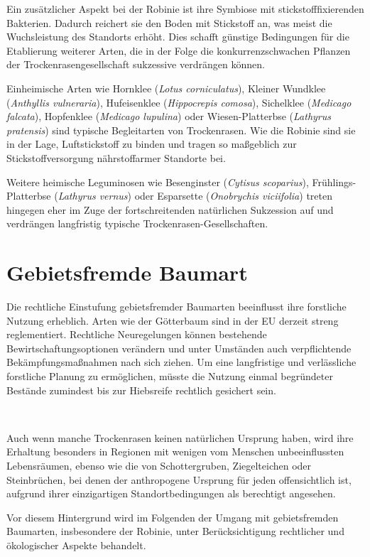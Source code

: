 \documentclass[twocolumn]{scrartcl}
\makeatletter
\newcommand{\summary}[1]{%
  \par %
  {\small\sffamily
    \noindent #1\par}
  \vspace{-0.4em}
  \noindent\makebox[\linewidth]{\rule{0.33\linewidth}{0.4pt}}\\[-1.2em]
  \@afterindentfalse\@afterheading
}
\makeatother
\begin{document}
Ein zusätzlicher Aspekt bei der Robinie ist ihre Symbiose mit
stickstofffixierenden Bakterien. Dadurch reichert sie den Boden mit
Stickstoff an, was meist die Wuchsleistung des Standorts erhöht. Dies
schafft günstige Bedingungen für die Etablierung weiterer Arten, die
in der Folge die konkurrenzschwachen Pflanzen der
Trockenrasengesellschaft sukzessive verdrängen können.

Einheimische Arten wie Hornklee (\emph{Lotus corniculatus}), Kleiner
Wundklee (\emph{Anthyllis vulneraria}), Hufeisenklee
(\emph{Hippocrepis comosa}), Sichelklee (\emph{Medicago falcata}),
Hopfenklee (\emph{Medicago lupulina}) oder Wiesen-Platterbse
(\emph{Lathyrus pratensis}) sind typische Begleitarten von
Trockenrasen. Wie die Robinie sind sie in der Lage, Luftstickstoff zu
binden und tragen so maßgeblich zur Stickstoffversorgung
nährstoffarmer Standorte bei.

Weitere heimische Leguminosen wie Besenginster (\emph{Cytisus
scoparius}), Frühlings-Platterbse (\emph{Lathyrus vernus}) oder
Esparsette (\emph{Onobrychis viciifolia}) treten hingegen eher im Zuge
der fortschreitenden natürlichen Sukzession auf und verdrängen
langfristig typische Trockenrasen-Gesellschaften.


\section{Gebietsfremde Baumart}

\summary{Die rechtliche Einstufung gebietsfremder Baumarten
  beeinflusst ihre forstliche Nutzung erheblich. Arten wie der
  Götterbaum sind in der EU derzeit streng reglementiert. Rechtliche
  Neuregelungen können bestehende Bewirtschaftungsoptionen verändern
  und unter Umständen auch verpflichtende Bekämpfungsmaßnahmen nach
  sich ziehen. Um eine langfristige und verlässliche forstliche
  Planung zu ermöglichen, müsste die Nutzung einmal begründeter
  Bestände zumindest bis zur Hiebsreife rechtlich gesichert sein.}

Auch wenn manche Trockenrasen keinen natürlichen Ursprung haben, wird
ihre Erhaltung besonders in Regionen mit wenigen vom Menschen
unbeeinflussten Lebensräumen, ebenso wie die von Schottergruben,
Ziegelteichen oder Steinbrüchen, bei denen der anthropogene Ursprung
für jeden offensichtlich ist, aufgrund ihrer einzigartigen
Standortbedingungen als berechtigt angesehen.

Vor diesem Hintergrund wird im Folgenden der Umgang mit gebietsfremden
Baumarten, insbesondere der Robinie, unter Berücksichtigung
rechtlicher und ökologischer Aspekte behandelt.
\end{document}
